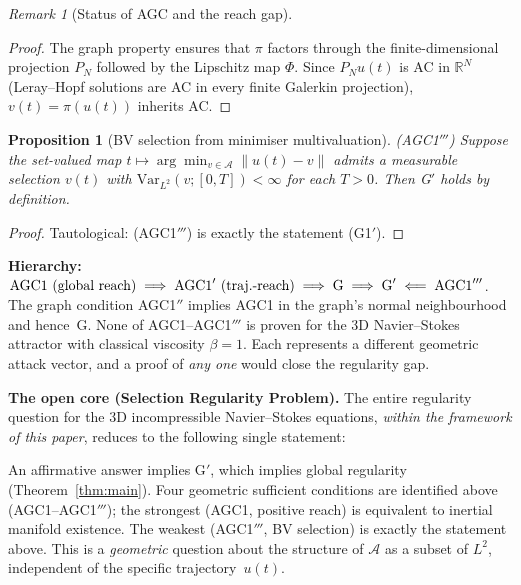 \documentclass[12pt,a4paper]{article}
\theoremstyle{definition}
\theoremstyle{plain}
\newtheorem{proposition}[definition]{Proposition}
\theoremstyle{remark}
\newtheorem{remark}[definition]{Remark}
\begin{document}
\begin{remark}[Status of AGC and the reach gap]
\begin{proof}
The graph property ensures that $\pi$ factors through the
finite-dimensional projection $P_N$ followed by the Lipschitz map
$\Phi$. Since $P_N u(t)$ is AC in $\mathbb{R}^N$ (Leray--Hopf
solutions are AC in every finite Galerkin projection),
$v(t) = \pi(u(t))$ inherits AC.
\end{proof}

\begin{proposition}[BV selection from minimiser multivaluation]
\label{prop:bv-selection}
\textup{(AGC1$'''$)}\;
Suppose the set-valued map $t \mapsto \arg\min_{v \in \mathcal{A}}
\|u(t)-v\|$ admits a measurable selection $v(t)$ with
$\mathrm{Var}_{L^2}(v; [0,T]) < \infty$ for each $T > 0$.
Then G$'$ holds by definition.
\end{proposition}

\begin{proof}
Tautological: (AGC1$'''$) is exactly the statement (G1$'$).
\end{proof}

\noindent
\textbf{Hierarchy:}\;
$\textup{AGC1 (global reach)}
\;\Longrightarrow\;
\textup{AGC1}' \textup{ (traj.-reach)}
\;\Longrightarrow\;
\textup{G}
\;\Longrightarrow\;
\textup{G}'
\;\Longleftarrow\;
\textup{AGC1}'''$.
The graph condition AGC1$''$ implies AGC1 in the graph's normal
neighbourhood and hence~G.
None of AGC1--AGC1$'''$ is proven for the 3D Navier--Stokes attractor
with classical viscosity $\beta = 1$. Each represents a different
geometric attack vector, and a proof of \emph{any one} would close the
regularity gap.

\medskip\noindent
\textbf{The open core (Selection Regularity Problem).}\;
The entire regularity question for the 3D incompressible Navier--Stokes
equations, \emph{within the framework of this paper}, reduces to the
following single statement:

\begin{center}
\end{center}

\noindent
An affirmative answer implies G$'$, which implies global regularity
(Theorem~\ref{thm:main}). Four geometric sufficient conditions are
identified above (AGC1--AGC1$'''$); the strongest (AGC1, positive reach)
is equivalent to inertial manifold existence. The weakest
(AGC1$'''$, BV selection) is exactly the statement above.
This is a \emph{geometric} question about the structure of
$\mathcal{A}$ as a subset of $L^2$, independent of the specific
trajectory~$u(t)$.


\end{remark}
\end{document}

